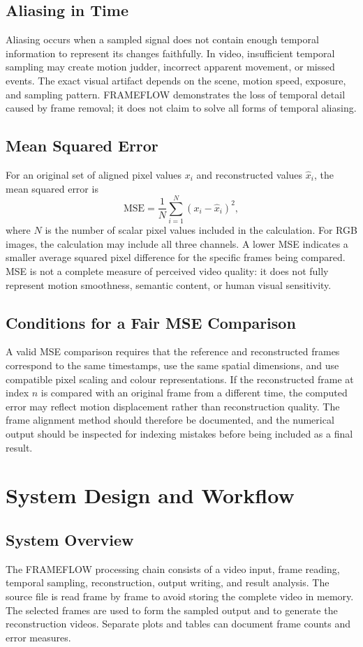 \documentclass[12pt,a4paper,oneside]{report}
\begin{document}
\section{Aliasing in Time}
Aliasing occurs when a sampled signal does not contain enough temporal information to represent its changes faithfully. In video, insufficient temporal sampling may create motion judder, incorrect apparent movement, or missed events. The exact visual artifact depends on the scene, motion speed, exposure, and sampling pattern. FRAMEFLOW demonstrates the loss of temporal detail caused by frame removal; it does not claim to solve all forms of temporal aliasing.

\section{Mean Squared Error}
For an original set of aligned pixel values $x_i$ and reconstructed values $\hat{x}_i$, the mean squared error is
\[
\mathrm{MSE}=\frac{1}{N}\sum_{i=1}^{N}(x_i-\hat{x}_i)^2,
\]
where $N$ is the number of scalar pixel values included in the calculation. For RGB images, the calculation may include all three channels. A lower MSE indicates a smaller average squared pixel difference for the specific frames being compared. MSE is not a complete measure of perceived video quality: it does not fully represent motion smoothness, semantic content, or human visual sensitivity.

\section{Conditions for a Fair MSE Comparison}
A valid MSE comparison requires that the reference and reconstructed frames correspond to the same timestamps, use the same spatial dimensions, and use compatible pixel scaling and colour representations. If the reconstructed frame at index $n$ is compared with an original frame from a different time, the computed error may reflect motion displacement rather than reconstruction quality. The frame alignment method should therefore be documented, and the numerical output should be inspected for indexing mistakes before being included as a final result.

\chapter{System Design and Workflow}
\section{System Overview}
The FRAMEFLOW processing chain consists of a video input, frame reading, temporal sampling, reconstruction, output writing, and result analysis. The source file is read frame by frame to avoid storing the complete video in memory. The selected frames are used to form the sampled output and to generate the reconstruction videos. Separate plots and tables can document frame counts and error measures.
\end{document}
